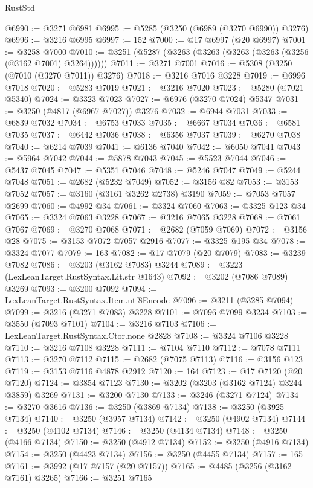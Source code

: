 \begin{lexlean}{RustStd}
\begin{coremodule}
@6990 := @3271 @6981
@6995 := @5285 (@3250 (@6989 (@3270 @6990)) @3276)
@6996 := @3216 @6995
@6997 := 152
@7000 := @17 @6997 (@20 @6997)
@7001 := @3258 @7000
@7010 := @3251 (@5287 (@3263 (@3263 (@3263 (@3263 (@3256 (@3162 @7001) @3264))))))
@7011 := @3271 @7001
@7016 := @5308 (@3250 (@7010 (@3270 @7011)) @3276)
@7018 := @3216 @7016 @3228
@7019 := @6996 @7018
@7020 := @5283 @7019
@7021 := @3216 @7020
@7023 := @5280 (@7021 @5340)
@7024 := @3323 @7023
@7027 := @6976 (@3270 @7024) @5347
@7031 := @3250 (@4817 (@6967 @7027)) @3276
@7032 := @6944 @7031
@7033 := @6839 @7032
@7034 := @6753 @7033
@7035 := @6667 @7034
@7036 := @6581 @7035
@7037 := @6442 @7036
@7038 := @6356 @7037
@7039 := @6270 @7038
@7040 := @6214 @7039
@7041 := @6136 @7040
@7042 := @6050 @7041
@7043 := @5964 @7042
@7044 := @5878 @7043
@7045 := @5523 @7044
@7046 := @5437 @7045
@7047 := @5351 @7046
@7048 := @5246 @7047
@7049 := @5244 @7048
@7051 := @2682 (@5232 @7049)
@7052 := @3156 @82
@7053 := @3153 @7052
@7057 := @3160 (@3161 @3262 @2738) @3190
@7059 := @7053 @7057 @2699
@7060 := @4992 @34
@7061 := @3324 @7060
@7063 := @3325 @123 @34
@7065 := @3324 @7063 @3228
@7067 := @3216 @7065 @3228
@7068 := @7061 @7067
@7069 := @3270 @7068
@7071 := @2682 (@7059 @7069)
@7072 := @3156 @28
@7075 := @3153 @7072 @7057 @2916
@7077 := @3325 @195 @34
@7078 := @3324 @7077
@7079 := 163
@7082 := @17 @7079 (@20 @7079)
@7083 := @3239 @7082
@7086 := @3203 (@3162 @7083) @3244
@7089 := @3223 (LexLeanTarget.RustSyntax.Lit.str @1643)
@7092 := @3202 (@7086 @7089) @3269
@7093 := @3200 @7092
@7094 := LexLeanTarget.RustSyntax.Item.utf8Encode
@7096 := @3211 (@3285 @7094)
@7099 := @3216 (@3271 @7083) @3228
@7101 := @7096 @7099 @3234
@7103 := @3550 (@7093 @7101)
@7104 := @3216 @7103
@7106 := LexLeanTarget.RustSyntax.Ctor.none @2828
@7108 := @3324 @7106 @3228
@7110 := @3216 @7108 @3228
@7111 := @7104 @7110
@7112 := @7078 @7111
@7113 := @3270 @7112
@7115 := @2682 (@7075 @7113)
@7116 := @3156 @123
@7119 := @3153 @7116 @4878 @2912
@7120 := 164
@7123 := @17 @7120 (@20 @7120)
@7124 := @3854 @7123
@7130 := @3202 (@3203 (@3162 @7124) @3244 @3859) @3269
@7131 := @3200 @7130
@7133 := @3246 (@3271 @7124)
@7134 := @3270 @3616
@7136 := @3250 (@3869 @7134)
@7138 := @3250 (@3925 @7134)
@7140 := @3250 (@3957 @7134)
@7142 := @3250 (@4902 @7134)
@7144 := @3250 (@4102 @7134)
@7146 := @3250 (@4134 @7134)
@7148 := @3250 (@4166 @7134)
@7150 := @3250 (@4912 @7134)
@7152 := @3250 (@4916 @7134)
@7154 := @3250 (@4423 @7134)
@7156 := @3250 (@4455 @7134)
@7157 := 165
@7161 := @3992 (@17 @7157 (@20 @7157))
@7165 := @4485 (@3256 (@3162 @7161) @3265)
@7166 := @3251 @7165

\end{coremodule}
\end{lexlean}
